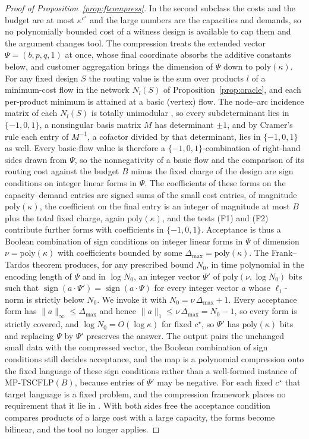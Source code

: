 \begin{proof}[Proof of Proposition~\ref{prop:ftcompress}]
In the second subclass the costs and the budget are at most
$\kappa^{c^\star}$ and the large numbers are the capacities and
demands, so no polynomially bounded cost of a witness design is
available to cap them and the argument changes tool. The compression
treats the extended vector
$\Psi=(b,p,q,1)$ at once, whose final coordinate absorbs the additive
constants below, and customer aggregation brings the dimension of
$\Psi$ down to $\mathrm{poly}(\kappa)$. For any fixed design $S$ the
routing value is the sum over products $l$ of a minimum-cost flow in
the network $N_l(S)$ of Proposition~\ref{prop:oracle}, and each
per-product minimum is attained at a basic (vertex) flow. The
node--arc incidence matrix of each $N_l(S)$ is totally unimodular
\citep{Schrijver1986}, so every subdeterminant lies in $\{-1,0,1\}$, a
nonsingular basis matrix $M$ has determinant $\pm 1$, and by Cramer's
rule each entry of $M^{-1}$, a cofactor divided by that determinant,
lies in $\{-1,0,1\}$ as well. Every basic-flow value is therefore a
$\{-1,0,1\}$-combination of right-hand sides drawn from $\Psi$, so the
nonnegativity of a basic flow and the comparison of its routing cost
against the budget $B$ minus the fixed charge of the design are sign
conditions on integer linear forms in $\Psi$. The coefficients of these
forms on the capacity--demand entries are signed sums of the small cost
entries, of magnitude $\mathrm{poly}(\kappa)$, the coefficient on the
final entry is an integer of magnitude at most $B$ plus the total fixed
charge, again $\mathrm{poly}(\kappa)$, and the tests (F1) and (F2)
contribute further forms with coefficients in $\{-1,0,1\}$. Acceptance
is thus a Boolean combination of sign conditions on integer linear
forms in $\Psi$ of dimension $\nu=\mathrm{poly}(\kappa)$ with
coefficients bounded by some
$\Delta_{\max}=\mathrm{poly}(\kappa)$. The Frank--Tardos theorem
\citep{FrankTardos1987,EtscheidKratschMnichRoeglin2017} produces, for
any prescribed bound $N_0$, in time
polynomial in the encoding length of $\Psi$ and in $\log N_0$, an integer vector $\Psi'$ of
$\mathrm{poly}(\nu,\log N_0)$ bits such that
$\operatorname{sign}(a\cdot\Psi')=\operatorname{sign}(a\cdot\Psi)$ for
every integer vector $a$ whose $\ell_1$-norm is strictly below $N_0$.
We invoke it with $N_0=\nu\,\Delta_{\max}+1$. Every acceptance form
has $\lVert a\rVert_{\infty}\le\Delta_{\max}$ and hence
$\lVert a\rVert_{1}\le\nu\,\Delta_{\max}=N_0-1$, so every form is
strictly covered, and $\log N_0=O(\log\kappa)$ for fixed $c^\star$,
so $\Psi'$ has $\mathrm{poly}(\kappa)$ bits and replacing $\Psi$ by
$\Psi'$ preserves the answer. The output pairs the unchanged
small data with the compressed vector, the Boolean combination of sign
conditions still decides acceptance, and the map is a polynomial
compression onto the fixed language of these sign conditions rather
than a well-formed instance of $\mathrm{MP\text{-}TSCFLP}(B)$, because
entries of $\Psi'$ may be negative. For each fixed $c^\star$ that
target language is a fixed problem, and the compression framework
places no requirement that it lie in \NP. With
both sides free the acceptance condition compares products of a large cost
with a large capacity, the forms become bilinear, and the tool no longer
applies.
\end{proof}
